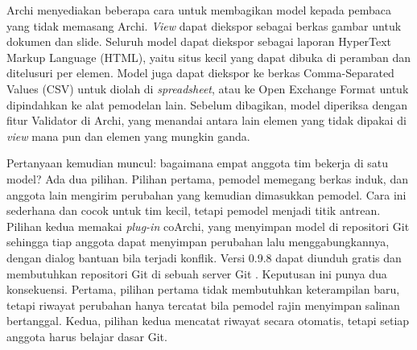 Archi menyediakan beberapa cara untuk membagikan model kepada pembaca yang
tidak memasang Archi. \textit{View} dapat diekspor sebagai berkas gambar untuk
dokumen dan slide. Seluruh model dapat diekspor sebagai laporan HyperText
Markup Language (HTML), yaitu situs kecil yang dapat dibuka di peramban dan
ditelusuri per elemen. Model juga dapat diekspor ke berkas Comma-Separated
Values (CSV) untuk diolah di \textit{spreadsheet}, atau ke Open Exchange
Format untuk dipindahkan ke alat pemodelan lain. Sebelum dibagikan, model
diperiksa dengan fitur Validator di Archi, yang menandai antara lain elemen
yang tidak dipakai di \textit{view} mana pun dan elemen yang mungkin ganda.

Pertanyaan kemudian muncul: bagaimana empat anggota tim bekerja di satu
model? Ada dua pilihan. Pilihan pertama, pemodel memegang berkas induk, dan
anggota lain mengirim perubahan yang kemudian dimasukkan pemodel. Cara ini
sederhana dan cocok untuk tim kecil, tetapi pemodel menjadi titik antrean.
Pilihan kedua memakai \textit{plug-in} coArchi, yang menyimpan model di
repositori Git sehingga tiap anggota dapat menyimpan perubahan lalu
menggabungkannya, dengan dialog bantuan bila terjadi konflik. Versi 0.9.8
dapat diunduh gratis dan membutuhkan repositori Git di sebuah server Git
\cite{c04-archiplugin}. Keputusan ini punya dua konsekuensi. Pertama, pilihan
pertama tidak membutuhkan keterampilan baru, tetapi riwayat perubahan hanya
tercatat bila pemodel rajin menyimpan salinan bertanggal. Kedua, pilihan
kedua mencatat riwayat secara otomatis, tetapi setiap anggota harus belajar
dasar Git.

